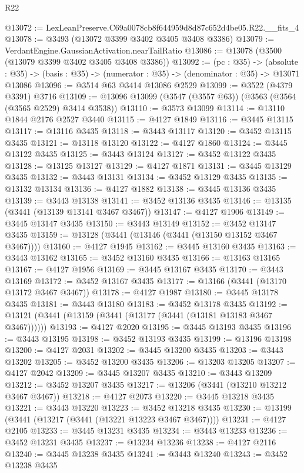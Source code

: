 \begin{lexlean}{R22}
\begin{coremodule}
@13072 := LexLeanPreserve.C69a0078cb8f644959d8d87c652d4be05.R22.__fits_4
@13078 := @3493 (@13072 @3399 @3402 @3405 @3408 @3386)
@13079 := VerdantEngine.GaussianActivation.nearTailRatio
@13086 := @13078 (@3500 (@13079 @3399 @3402 @3405 @3408 @3386))
@13092 := (pc : @35) ->
  (absolute : @35) -> (basis : @35) -> (numerator : @35) -> (denominator : @35) -> @13071 @13086
@13096 := @3514 @63 @3414 @13086 @2529
@13099 := @3522 (@4379 @3391) @3716
@13109 := @13096 @13099 (@3547 (@3557 @63)) (@3563 (@3564 (@3565 @2529) @3414 @3538))
@13110 := @3573 @13099
@13114 := @13110 @1844 @2176 @2527 @3440
@13115 := @4127 @1849
@13116 := @3445 @13115
@13117 := @13116 @3435
@13118 := @3443 @13117
@13120 := @3452 @13115 @3435
@13121 := @13118 @13120
@13122 := @4127 @1860
@13124 := @3445 @13122 @3435
@13125 := @3443 @13124
@13127 := @3452 @13122 @3435
@13128 := @13125 @13127
@13129 := @4127 @1871
@13131 := @3445 @13129 @3435
@13132 := @3443 @13131
@13134 := @3452 @13129 @3435
@13135 := @13132 @13134
@13136 := @4127 @1882
@13138 := @3445 @13136 @3435
@13139 := @3443 @13138
@13141 := @3452 @13136 @3435
@13146 := @13135 (@3441 (@13139 @13141 @3467 @3467))
@13147 := @4127 @1906
@13149 := @3445 @13147 @3435
@13150 := @3443 @13149
@13152 := @3452 @13147 @3435
@13159 := @13128 (@3441 (@13146 (@3441 (@13150 @13152 @3467 @3467))))
@13160 := @4127 @1945
@13162 := @3445 @13160 @3435
@13163 := @3443 @13162
@13165 := @3452 @13160 @3435
@13166 := @13163 @13165
@13167 := @4127 @1956
@13169 := @3445 @13167 @3435
@13170 := @3443 @13169
@13172 := @3452 @13167 @3435
@13177 := @13166 (@3441 (@13170 @13172 @3467 @3467))
@13178 := @4127 @1987
@13180 := @3445 @13178 @3435
@13181 := @3443 @13180
@13183 := @3452 @13178 @3435
@13192 := @13121 (@3441 (@13159 (@3441 (@13177 (@3441 (@13181 @13183 @3467 @3467))))))
@13193 := @4127 @2020
@13195 := @3445 @13193 @3435
@13196 := @3443 @13195
@13198 := @3452 @13193 @3435
@13199 := @13196 @13198
@13200 := @4127 @2031
@13202 := @3445 @13200 @3435
@13203 := @3443 @13202
@13205 := @3452 @13200 @3435
@13206 := @13203 @13205
@13207 := @4127 @2042
@13209 := @3445 @13207 @3435
@13210 := @3443 @13209
@13212 := @3452 @13207 @3435
@13217 := @13206 (@3441 (@13210 @13212 @3467 @3467))
@13218 := @4127 @2073
@13220 := @3445 @13218 @3435
@13221 := @3443 @13220
@13223 := @3452 @13218 @3435
@13230 := @13199 (@3441 (@13217 (@3441 (@13221 @13223 @3467 @3467))))
@13231 := @4127 @2105
@13233 := @3445 @13231 @3435
@13234 := @3443 @13233
@13236 := @3452 @13231 @3435
@13237 := @13234 @13236
@13238 := @4127 @2116
@13240 := @3445 @13238 @3435
@13241 := @3443 @13240
@13243 := @3452 @13238 @3435

\end{coremodule}
\end{lexlean}
